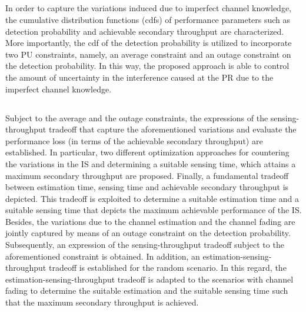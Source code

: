 \subsection{}
In order to capture the variations induced due to imperfect channel knowledge, the cumulative distribution functions (cdfs) of performance parameters such as detection probability and achievable secondary throughput are characterized. More importantly, the cdf of the detection probability is utilized to incorporate two PU constraints, namely, an average constraint and an outage constraint on the detection probability. In this way, the proposed approach is able to control the amount of uncertainty in the interference caused at the PR due to the imperfect channel knowledge. 
\subsection{}
Subject to the average and the outage constraints, the expressions of the sensing-throughput tradeoff that capture the aforementioned variations and evaluate the performance loss (in terms of the achievable secondary throughput) are established. In particular, two different optimization approaches for countering the variations in the IS and determining a suitable sensing time, which attains a maximum secondary throughput are proposed. Finally, a fundamental tradeoff between estimation time, sensing time and achievable secondary throughput is depicted. This tradeoff is exploited to determine a suitable estimation time and a suitable sensing time that depicts the maximum achievable performance of the IS. 
Besides, the variations due to the channel estimation and the channel fading are jointly captured by means of an outage constraint on the detection probability. Subsequently, an expression of the sensing-throughput tradeoff subject to the aforementioned constraint is obtained.
In addition, an estimation-sensing-throughput tradeoff is established for the random scenario. In this regard, the estimation-sensing-throughput tradeoff is adapted to the scenarios with channel fading to determine the suitable estimation and the suitable sensing time such that the maximum secondary throughput is achieved.
 
